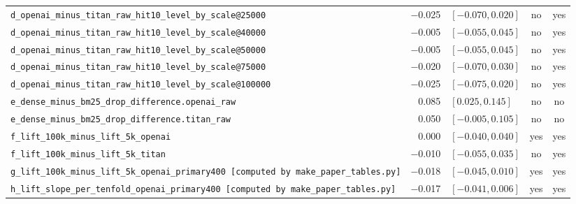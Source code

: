\begin{table}[t]
{\begin{tabular}{lrlcc}
\texttt{d\_openai\_minus\_titan\_raw\_hit10\_level\_by\_scale@25000} & $-$0.025 & $[-0.070, 0.020]$ & no & yes \\
\texttt{d\_openai\_minus\_titan\_raw\_hit10\_level\_by\_scale@40000} & $-$0.005 & $[-0.055, 0.045]$ & no & yes \\
\texttt{d\_openai\_minus\_titan\_raw\_hit10\_level\_by\_scale@50000} & $-$0.005 & $[-0.055, 0.045]$ & no & yes \\
\texttt{d\_openai\_minus\_titan\_raw\_hit10\_level\_by\_scale@75000} & $-$0.020 & $[-0.070, 0.030]$ & no & yes \\
\texttt{d\_openai\_minus\_titan\_raw\_hit10\_level\_by\_scale@100000} & $-$0.025 & $[-0.075, 0.020]$ & no & yes \\
\texttt{e\_dense\_minus\_bm25\_drop\_difference.openai\_raw} & 0.085 & $[0.025, 0.145]$ & no & no \\
\texttt{e\_dense\_minus\_bm25\_drop\_difference.titan\_raw} & 0.050 & $[-0.005, 0.105]$ & no & no \\
\texttt{f\_lift\_100k\_minus\_lift\_5k\_openai} & 0.000 & $[-0.040, 0.040]$ & yes & yes \\
\texttt{f\_lift\_100k\_minus\_lift\_5k\_titan} & $-$0.010 & $[-0.055, 0.035]$ & no & yes \\
\texttt{g\_lift\_100k\_minus\_lift\_5k\_openai\_primary400 [computed by make\_paper\_tables.py]} & $-$0.018 & $[-0.045, 0.010]$ & yes & yes \\
\texttt{h\_lift\_slope\_per\_tenfold\_openai\_primary400 [computed by make\_paper\_tables.py]} & $-$0.017 & $[-0.041, 0.006]$ & yes & yes \\
\bottomrule
\end{tabular}}
\end{table}
